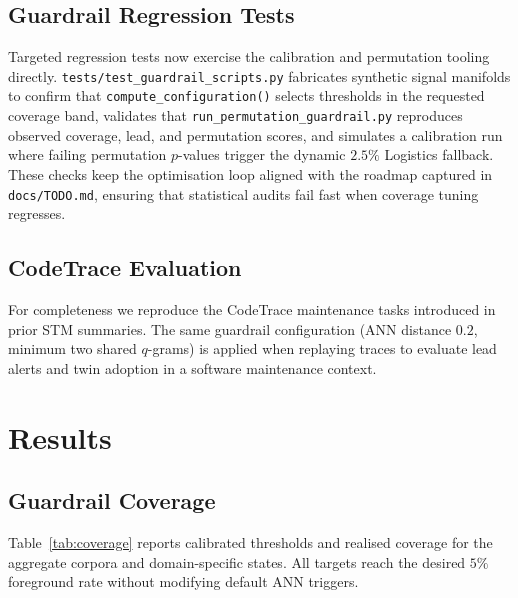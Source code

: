 \documentclass[11pt]{article}
\begin{document}
\subsection{Guardrail Regression Tests}
Targeted regression tests now exercise the calibration and permutation tooling
directly. \texttt{tests/test\_guardrail\_scripts.py} fabricates synthetic signal
manifolds to confirm that \texttt{compute\_configuration()} selects thresholds in
the requested coverage band, validates that
\texttt{run\_permutation\_guardrail.py} reproduces observed coverage, lead, and
permutation scores, and simulates a calibration run where failing
permutation $p$-values trigger the dynamic $2.5\%$ Logistics fallback. These
checks keep the optimisation loop aligned with the roadmap captured in
\texttt{docs/TODO.md}, ensuring that statistical audits fail fast when coverage
tuning regresses.

\subsection{CodeTrace Evaluation}
For completeness we reproduce the CodeTrace maintenance tasks introduced in
prior STM summaries. The same guardrail configuration (ANN distance $0.2$,
minimum two shared $q$-grams) is applied when replaying traces to evaluate lead
alerts and twin adoption in a software maintenance context.

\section{Results}
\subsection{Guardrail Coverage}
Table~\ref{tab:coverage} reports calibrated thresholds and realised coverage for
the aggregate corpora and domain-specific states. All targets reach the desired
$5\%$ foreground rate without modifying default ANN triggers.
\end{document}
